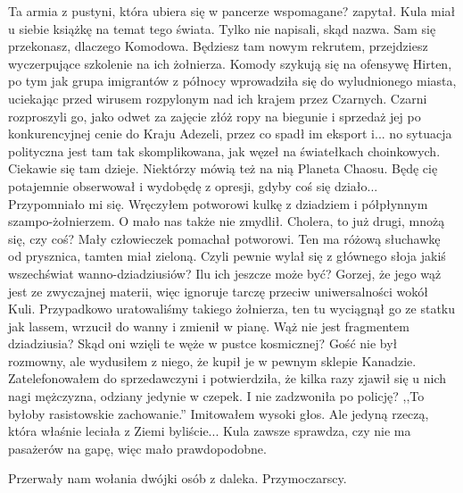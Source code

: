\begin{dialogue}
\ds{} Ta armia z pustyni, która ubiera się w pancerze wspomagane? \dm{} zapytał. \dm{} Kula miał u siebie książkę na temat tego świata. Tylko nie napisali, skąd nazwa.
\ds{} Sam się przekonasz, dlaczego Komodowa. Będziesz tam nowym rekrutem, przejdziesz wyczerpujące szkolenie na ich żołnierza. 
Komody szykują się na ofensywę Hirten, po tym jak grupa imigrantów z północy wprowadziła się do wyludnionego miasta, uciekając przed wirusem rozpylonym nad ich krajem przez Czarnych.
Czarni rozproszyli go, jako odwet za zajęcie złóż ropy na biegunie i sprzedaż jej po konkurencyjnej cenie do Kraju Adezeli, przez co spadł im eksport i... 
no sytuacja polityczna jest tam tak skomplikowana, jak węzeł na światełkach choinkowych.
\ds{} Ciekawie się tam dzieje.
\ds{} Niektórzy mówią też na nią Planeta Chaosu. Będę cię potajemnie obserwował i wydobędę z opresji, gdyby coś się działo...
\ds{} Przypomniało mi się. \dm{} Wręczyłem potworowi kulkę z dziadziem i półpłynnym szampo-żołnierzem. \dm{} O mało nas także nie zmydlił.
\ds{} Cholera, to już drugi, mnożą się, czy coś? \dm{} Mały człowieczek pomachał potworowi. 
\ds{} Ten ma różową słuchawkę od prysznica, tamten miał zieloną. 
\ds{} Czyli pewnie wylał się z głównego słoja jakiś wszechświat wanno-dziadziusiów? Ilu ich jeszcze może być?
\ds{} Gorzej, że jego wąż jest ze zwyczajnej materii, więc ignoruje tarczę przeciw uniwersalności wokół Kuli.
Przypadkowo uratowaliśmy takiego żołnierza, ten tu wyciągnął go ze statku jak lassem, wrzucił do wanny i zmienił w pianę.
\ds{} Wąż nie jest fragmentem dziadziusia? Skąd oni wzięli te węże w pustce kosmicznej?
\ds{} Gość nie był rozmowny, ale wydusiłem z niego, że kupił je w pewnym sklepie Kanadzie. 
Zatelefonowałem do sprzedawczyni i potwierdziła, że kilka razy zjawił się u nich nagi mężczyzna, odziany jedynie w czepek.
\ds{} I nie zadzwoniła po policję?
\ds{} ,,To byłoby rasistowskie zachowanie.'' \dm{} Imitowałem wysoki głos.
\ds{} Ale jedyną rzeczą, która właśnie leciała z Ziemi byliście...
\ds{} Kula zawsze sprawdza, czy nie ma pasażerów na gapę, więc mało prawdopodobne.

\end{dialogue}
Przerwały nam wołania dwójki osób z daleka. Przymoczarscy. 
